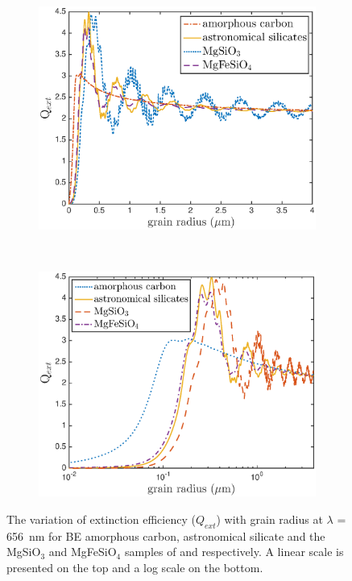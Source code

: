 \begin{figure}

\begin{subfigure}{1\textwidth}
\centering
\includegraphics[trim =20 0 45 15,clip=true,scale=0.7]{chapters/chapter4/images/Qext_grainsize_upto4}
\end{subfigure}\\[1ex]
\begin{subfigure}{\textwidth}
\centering
\includegraphics[trim =20 0 45 15,clip=true,scale=0.7]{chapters/chapter4/images/Qext_grainsize_upto4_log}
\end{subfigure}
\caption{The variation of extinction efficiency ($Q_{ext}$) 
with grain radius at $\lambda$ =  656~nm for \citet{Zubko1996} BE amorphous 
carbon, \citet{Draine1984} astronomical silicate and the
MgSiO$_3$ and MgFeSiO$_4$ samples of \citet{Jager2003} and 
\citet{Dorschner1995} respectively. A linear scale is presented on the top and a log scale on the bottom.}
\label{Qext_grain}
\end{figure}

